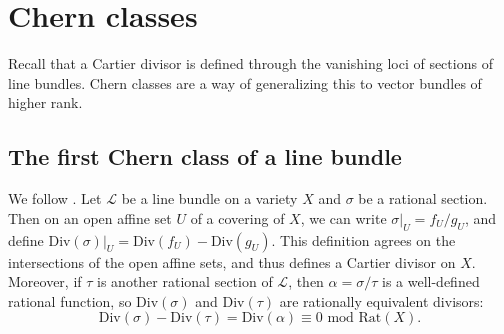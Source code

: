 \section{Chern classes}






Recall that a Cartier divisor is defined through the vanishing loci of sections of line bundles. Chern classes are a way of generalizing this to vector bundles of higher rank.

\subsection{The first Chern class of a line bundle}

We follow \cite[Section 1.4]{EH16}. Let $\mathcal{L}$ be a line bundle on a variety $X$ and $\sigma$ be a rational section. Then on an open affine set $U$ of a covering of $X$, we can write $\sigma|_U = f_U / g_U$, and define $\text{Div}(\sigma)|_U = \text{Div}(f_U) - \text{Div}(g_U)$. This definition agrees on the intersections of the open affine sets, and thus defines a Cartier divisor on $X$. Moreover, if $\tau$ is another rational section of $\mathcal{L}$, then $\alpha = \sigma / \tau$ is a well-defined rational function, so $\mathrm{Div}(\sigma)$ and $\mathrm{Div}(\tau)$ are rationally equivalent divisors: 
\[\mathrm{Div}(\sigma) - \mathrm{Div}(\tau) = \mathrm{Div}(\alpha) \equiv 0 \text{ mod } \mathrm{Rat}(X).\]


